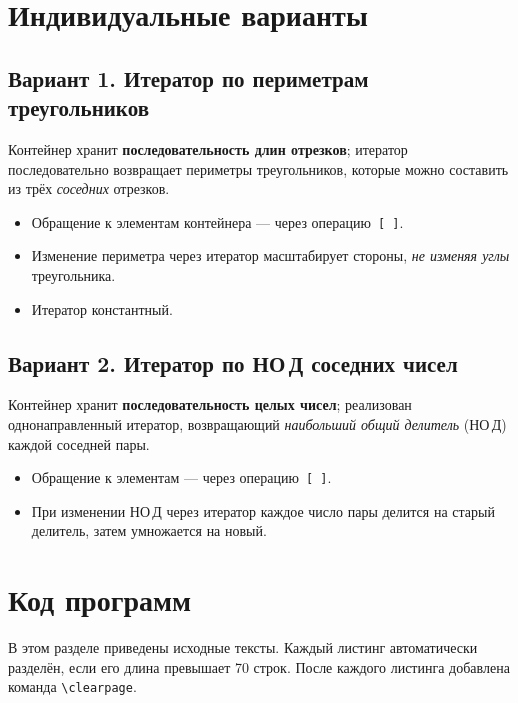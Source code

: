 \documentclass[a4paper, 14pt]{extarticle}
\begin{document}
\section{Индивидуальные варианты}\label{sect:variant}
\subsection*{Вариант 1. Итератор по периметрам треугольников}
Контейнер хранит \textbf{последовательность длин отрезков};
итератор последовательно возвращает периметры треугольников,
которые можно составить из трёх \emph{соседних} отрезков.
\begin{itemize}[nosep]
  \item Обращение к элементам контейнера — через операцию~\lstinline|[ ]|.
  \item Изменение периметра через итератор масштабирует стороны,
        \emph{не изменяя углы} треугольника.
  \item Итератор константный.
\end{itemize}

\subsection*{Вариант 2. Итератор по НО Д соседних чисел}
Контейнер хранит \textbf{последовательность целых чисел};
реализован однонаправленный итератор, возвращающий
\emph{наибольший общий делитель} (НО Д) каждой соседней пары.
\begin{itemize}[nosep]
  \item Обращение к элементам — через операцию~\lstinline|[ ]|.
  \item При изменении НО Д через итератор каждое число пары
        делится на старый делитель, затем умножается на новый.
\end{itemize}

\section{Код программ}\label{sect:listings}
В этом разделе приведены исходные тексты.
Каждый листинг автоматически разделён, если его длина превышает 70 строк.
После каждого листинга добавлена команда \verb|\clearpage|.
\end{document}
